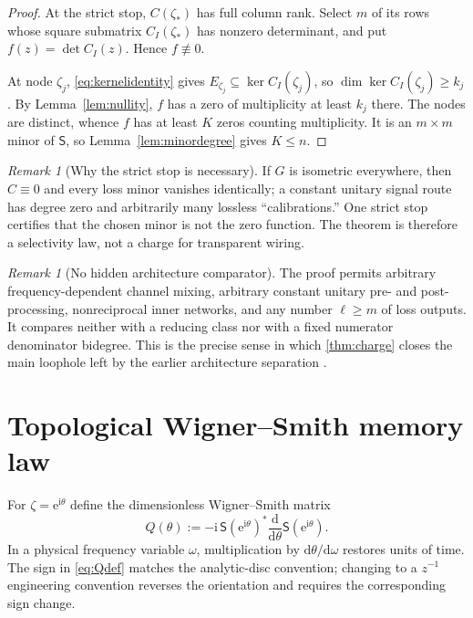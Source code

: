 \documentclass[11pt]{article}
\theoremstyle{definition}
\theoremstyle{remark}
\newtheorem{remark}[theorem]{Remark}
\newcommand{\dd}{\mathrm{d}}
\newcommand{\e}{\mathrm{e}}
\begin{document}
\begin{proof}
At the strict stop, $C(\zeta_*)$ has full column rank.  Select $m$ of its rows
whose square submatrix $C_I(\zeta_*)$ has nonzero determinant, and put
$f(z)=\det C_I(z)$.  Hence $f\not\equiv0$.

At node $\zeta_j$, \eqref{eq:kernelidentity} gives
$E_{\zeta_j}\subseteq\ker C_I(\zeta_j)$, so
$\dim\ker C_I(\zeta_j)\geq k_j$.  By Lemma~\ref{lem:nullity}, $f$ has a zero of
multiplicity at least $k_j$ there.  The nodes are distinct, whence $f$ has at
least $K$ zeros counting multiplicity.  It is an $m\times m$ minor of
$\mathsf S$, so Lemma~\ref{lem:minordegree} gives $K\leq n$.
\end{proof}

\begin{remark}[Why the strict stop is necessary]
If $G$ is isometric everywhere, then $C\equiv0$ and every loss minor vanishes
identically; a constant unitary signal route has degree zero and arbitrarily
many lossless ``calibrations.''  One strict stop certifies that the chosen
minor is not the zero function.  The theorem is therefore a selectivity law,
not a charge for transparent wiring.
\end{remark}

\begin{remark}[No hidden architecture comparator]
The proof permits arbitrary frequency-dependent channel mixing, arbitrary
constant unitary pre- and post-processing, nonreciprocal inner networks, and
any number $\ell\geq m$ of loss outputs.  It compares neither with a reducing
class nor with a fixed numerator denominator bidegree.  This is the precise
sense in which \cref{thm:charge} closes the main loophole left by the earlier
architecture separation \cite{ErikssonReservoir2026}.
\end{remark}

\section{Topological Wigner--Smith memory law}

For $\zeta=\e^{\mathrm{i}\theta}$ define the dimensionless Wigner--Smith
matrix
\begin{equation}\label{eq:Qdef}
 Q(\theta):=-\mathrm{i}\,\mathsf S(\e^{\mathrm{i}\theta})^*
 \frac{\dd}{\dd\theta}\mathsf S(\e^{\mathrm{i}\theta}).
\end{equation}
In a physical frequency variable $\omega$, multiplication by
$\dd\theta/\dd\omega$ restores units of time.  The sign in
\eqref{eq:Qdef} matches the analytic-disc convention; changing to a
$z^{-1}$ engineering convention reverses the orientation and requires the
corresponding sign change.
\end{document}

